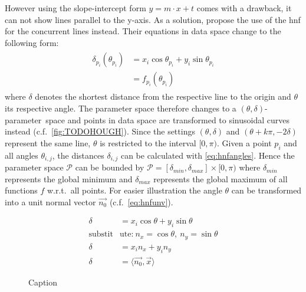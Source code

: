 However using the slope-intercept form $y = m \cdot x + t$ comes with a drawback, it can not show lines parallel to the y-axis. As a solution, \citeauthor{duda1971use} propose the use of the \gls{hnf} for the concurrent lines instead. Their equations in data space change to the following form:
\begin{align}\label{eq:hnfangles}
    \begin{split}
        \delta_{p_i}(\theta_{p_i}) &= x_i \cos{\theta_{p_i}} + y_i \sin{\theta_{p_i}}\\
        &= f_{p_i}(\theta_{p_i})
    \end{split}
\end{align}
where $\delta$ denotes the shortest distance from the respective line to the origin and $\theta$ its respective angle. The parameter space therefore changes to a \mbox{$(\theta,\delta)$-parameter space} and points in data space are transformed to sinusoidal curves instead (c.f.~\autoref{fig:TODOHOUGH}). 
Since the settings $(\theta,\delta)$ and $(\theta+k\pi,-2\delta)$ represent the same line, $\theta$ is restricted to the interval $[0,\pi)$. Given a point $p_i$ and all angles $\theta_{i,j}$, the distances $\delta_{i,j}$ can be calculated with \autoref{eq:hnfangles}. Hence the parameter space $\mathcal{P}$ can be bounded by $\mathcal{P} = [\delta_{min}, \delta_{max}]\times [0,\pi)$ where $\delta_{min}$ represents the global minimum and $\delta_{max}$ represents the global maximum of all functions $f$ w.r.t.\ all points. For easier illustration the angle $\theta$ can be transformed into a unit normal vector $\vec{n_0}$ (c.f.\ \autoref{eq:hnfunv}). 

\begin{align}
    \delta &= x_i \cos{\theta} + y_i \sin{\theta}\nonumber\\
    \text{substit}&\text{ute:}\ n_x = \cos{\theta},\ n_y = \sin{\theta} \nonumber\\
    \delta &= x_i n_x + y_i n_y\nonumber\\
    \label{eq:hnfunv}
    \delta &= \langle\vec{n_0},\vec{x}\rangle 
\end{align}

\begin{figure}
    \centering
    \caption{Caption}
    \label{fig:hnf_euclid}
\end{figure}


